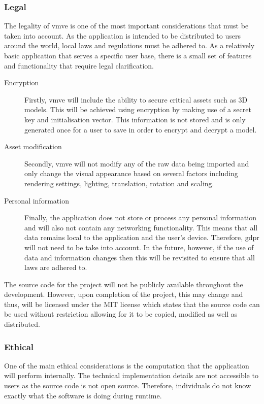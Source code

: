 \documentclass[11pt]{article}
\begin{document}
\subsubsection{Legal}
The legality of \gls*{vmve} is one of the most important considerations that
must be taken into account. As the application is intended to be distributed to
users around the world, local laws and regulations must be adhered to. As a
relatively basic application that serves a specific user base, there is a small
set of features and functionality that require legal clarification.

\begin{description}
  \item[Encryption]
    Firstly, \gls*{vmve} will include the ability to secure critical assets such
    as 3D models. This will be achieved using encryption by making use of a
    secret key and initialisation vector. This information is not stored and is
    only generated once for a user to save in order to encrypt and decrypt a
    model.

  \item[Asset modification] 
    Secondly, \gls*{vmve} will not modify any of the raw data being imported and
    only change the visual appearance based on several factors including
    rendering settings, lighting, translation, rotation and scaling. 

  \item[Personal information] 
    Finally, the application does not store or process any personal information
    and will also not contain any networking functionality. This means that all
    data remains local to the application and the user's device. Therefore,
    \gls*{gdpr} will not need to be take into account. In the future, however,
    if the use of data and information changes then this will be revisited to
    ensure that all laws are adhered to. 
\end{description}

The source code for the project will not be publicly available throughout the
development. However, upon completion of the project, this may change and thus,
will be licensed under the MIT license \cite{mit} which states that the source
code can be used without restriction allowing for it to be copied, modified as
well as distributed.

\subsubsection{Ethical}
One of the main ethical considerations is the computation that the application
will perform internally. The technical implementation details are not accessible
to users as the source code is not open source. Therefore, individuals do not
know exactly what the software is doing during runtime.
\end{document}
